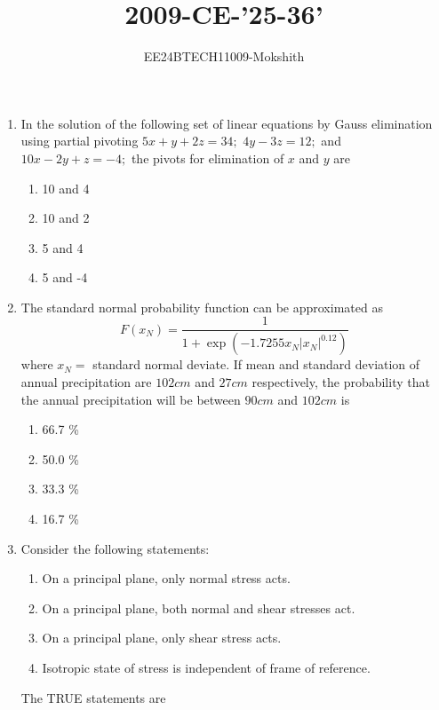 \documentclass[journal]{IEEEtran}
\begin{document}

\title{2009-CE-'25-36'}
\author{EE24BTECH11009-Mokshith}
{\let\newpage\relax\maketitle}
\renewcommand{\thefigure}{\theenumi}
\renewcommand{\thetable}{\theenumi}
\setlength{\intextsep}{10pt} %
\renewcommand{\thetable}{\theenumi
}
\begin{enumerate}[start=25]
\item In the solution of the following set of linear equations by Gauss elimination using partial pivoting
    $5x + y + 2z = 34;$ \quad $4y - 3z = 12;$ \quad and \quad $10x - 2y + z = -4;$
    the pivots for elimination of $x$ and $y$ are
\begin{enumerate}
    \item 10 and 4
    \item 10 and 2
    \item 5 and 4
    \item 5 and -4
\end{enumerate}
\item The standard normal probability function can be approximated as
$$F(x_N) = \frac{1}{1 + \exp(-1.7255 x_N |x_N|^{0.12})}$$
where $x_N =$ standard normal deviate. If mean and standard deviation of annual precipitation are $102 cm$ and $27 cm$ respectively, the probability that the annual precipitation will be between $90 cm$ and $102 cm$ is
\begin{enumerate}
    \item 66.7 \%
    \item 50.0 \%
    \item 33.3 \%
    \item 16.7 \%
\end{enumerate}
\item Consider the following statements:
\begin{enumerate}[label=\Roman{*}.]
    \item On a principal plane, only normal stress acts.
    \item On a principal plane, both normal and shear stresses act.
    \item On a principal plane, only shear stress acts.
    \item Isotropic state of stress is independent of frame of reference.
\end{enumerate}
The TRUE statements are
\begin{enumerate}

\end{enumerate}
\end{enumerate}
\end{document}
